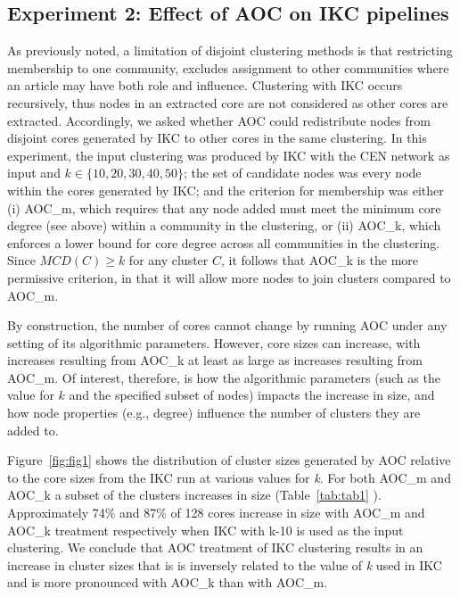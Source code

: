 \documentclass[11pt, oneside]{article}   	%
\begin{document}
\subsection{Experiment 2: Effect of AOC on IKC pipelines} As previously noted, a limitation of disjoint clustering methods is that restricting membership to one community, excludes assignment to other communities where an article may have both role and influence. Clustering with IKC occurs recursively, thus nodes in an extracted core are not considered as other cores are extracted. Accordingly, we asked whether AOC could redistribute nodes from disjoint cores generated by IKC to other cores in the same clustering. In this experiment, the input clustering was produced by IKC with the CEN network as input and $k \in \{10, 20, 30, 40, 50\}$; the set of candidate nodes was every node within the cores generated by IKC; and the criterion for membership was either (i) AOC\_m, which requires that any node added must meet the minimum core degree  (see above) within a community in the clustering, or (ii) AOC\_k, which enforces a lower bound for core degree across all communities in the clustering. Since $MCD(C) \geq k$ for any cluster $C$, it follows that AOC\_k is the more permissive criterion, in that it will allow more nodes to join clusters compared to AOC\_m.

By construction, the number of cores cannot change by running AOC  under any setting of its algorithmic parameters. However, core sizes can increase, with increases resulting from AOC\_k at least as large as increases resulting from AOC\_m.
Of interest, therefore, is how the algorithmic parameters (such as the value for $k$ and the specified subset of nodes) impacts the increase in size, and how node properties (e.g., degree) influence the number of clusters they are added to.

Figure~\ref{fig:fig1} shows the distribution of cluster sizes generated by AOC relative to the core sizes from the IKC run at various values for \emph{k}. For both AOC\_m and AOC\_k a subset of the clusters increases in size (Table~\ref{tab:tab1} ).
Approximately 74\% and 87\% of  128 cores increase in size with AOC\_m and AOC\_k treatment respectively when IKC with k-10 is used as the input clustering. We conclude that AOC treatment of IKC clustering results in an increase in cluster sizes that is is inversely related to the value of \emph{k} used in IKC and is more pronounced with AOC\_k than with AOC\_m. 
\end{document}
